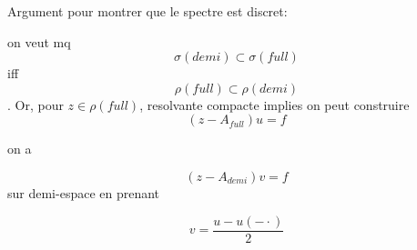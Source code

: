 Argument pour montrer que le spectre est discret:

on veut mq $$ \sigma(demi) \subset \sigma(full)$$ iff $$ \rho(full) \subset \rho(demi) $$. Or, pour $z\in \rho(full)$, resolvante compacte implies on peut construire
$$(z-A_{full})u=f$$

on a

$$(z-A_{demi})v =f$$ sur demi-espace en prenant

$$v = \frac{u-u(-\cdot)}2 $$